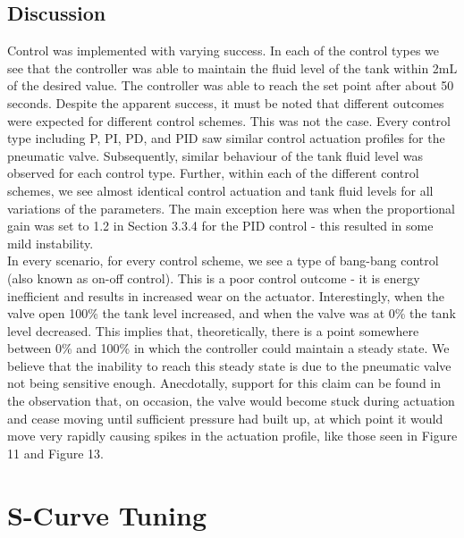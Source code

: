 \documentclass{article}
\begin{document}
\subsection{Discussion}
Control was implemented with varying success. In each of the control types we see that the controller was able to maintain the fluid level of the tank within 2$\si{\milli\liter}$ of the desired value. The controller was able to reach the set point after about 50 seconds. Despite the apparent success, it must be noted that different outcomes were expected for different control schemes. This was not the case. Every control type including P, PI, PD, and PID saw similar control actuation profiles for the pneumatic valve. Subsequently, similar behaviour of the tank fluid level was observed for each control type. Further, within each of the different control schemes, we see almost identical control actuation and tank fluid levels for all variations of the parameters. The main exception here was when the proportional gain was set to 1.2 in Section 3.3.4 for the PID control - this resulted in some mild instability.\\

In every scenario, for every control scheme, we see a type of bang-bang control (also known as on-off control). This is a poor control outcome - it is energy inefficient and results in increased wear on the actuator. Interestingly, when the valve open 100\% the tank level increased, and when the valve was at 0\% the tank level decreased. This implies that, theoretically, there is a point somewhere between 0\% and 100\% in which the controller could maintain a steady state. We believe that the inability to reach this steady state is due to the pneumatic valve not being sensitive enough. Anecdotally, support for this claim can be found in  the observation that, on occasion, the valve would become stuck during actuation and cease moving until sufficient pressure had built up, at which point it would move very rapidly causing spikes in the actuation profile, like those seen in Figure 11 and Figure 13.


\section{S-Curve Tuning}
\end{document}
